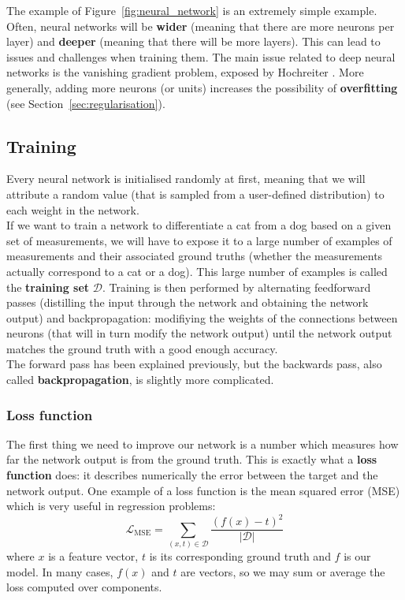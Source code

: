 The example of Figure~\ref{fig:neural_network} is an extremely simple example.
Often, neural networks will be \textbf{wider} (meaning that there are more
neurons per layer) and \textbf{deeper} (meaning that there will be more layers).
This can lead to issues and challenges when training them. The main issue
related to deep neural networks is the vanishing gradient problem, exposed
by Hochreiter \cite{vanishing_gradient}. More generally, adding more 
neurons (or units) increases the possibility of \textbf{overfitting} (see
Section~\ref{sec:regularisation}).

\subsection{Training}
\label{nn:training}
Every neural network is initialised randomly at first, meaning that we will
attribute a random value (that is sampled from a user-defined distribution)
to each weight in the network.\\

If we want to train a network to differentiate a cat from a dog based on a
given set of measurements, we will have to expose it to a large number of examples
of measurements and their associated ground truths 
(whether the measurements actually correspond to a cat or a dog). This large
number of examples is called the \textbf{training set} $\mathcal{D}$. 
 Training is
then performed by alternating feedforward passes (distilling the input through
the network and obtaining the network output) and backpropagation: modifiying 
the weights of the connections between neurons (that will in turn modify 
the network output) until the network output matches the ground truth with 
a good enough accuracy.\\

The forward pass has been explained previously, but the backwards pass, also
called \textbf{backpropagation}, is slightly more complicated.\\

\subsubsection{Loss function}
The first thing we need to improve our network is a number which measures
how far the network output is from the ground truth.
This is exactly what a \textbf{loss function}  does: 
it describes numerically the error between the target and the network output.
One example of a loss function is the mean squared error (MSE)  which
is very useful in regression problems:
$$ \mathcal{L}_{\text{MSE}} = \sum\limits_{(x, t) \in \mathcal{D}}\frac{(f(x)-t)^2}{|\mathcal{D}|}$$
where $x$ is a feature vector, $t$ is its corresponding ground truth and $f$
is our model. In
many cases, $f(x)$ and $t$ are vectors, so we may sum or average the loss computed
over components.\\

